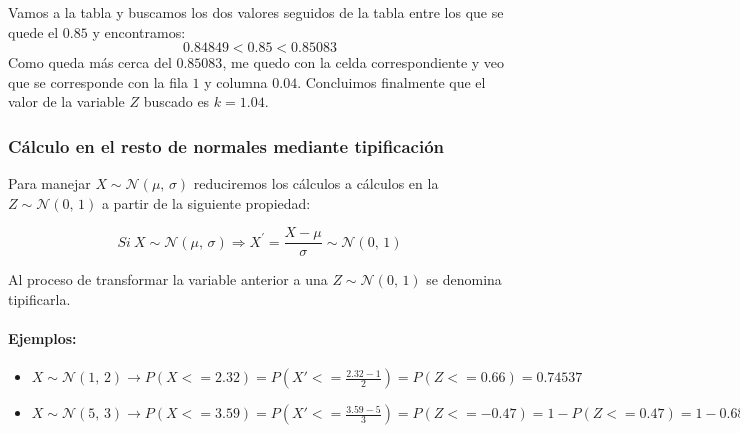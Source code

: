 Vamos a la tabla y buscamos los dos valores seguidos de la tabla entre los que se quede el $0.85$ y encontramos:
$$0.84849 < 0.85 < 0.85083 $$
Como queda más cerca del $0.85083$, me quedo con la celda correspondiente y veo que se corresponde con la fila $1$ y columna $0.04$. Concluimos finalmente que el valor de la variable $Z$ buscado es $k=1.04$.


\subsubsection{Cálculo en el resto de normales mediante tipificación}

Para manejar $X \sim \mathcal{N}(\mu,\,\sigma)$ reduciremos los cálculos a cálculos en la $Z \sim \mathcal{N}(0,\,1)$ a partir de la siguiente propiedad:

$$ Si \  X \sim \mathcal{N}(\mu,\,\sigma) \Rightarrow X^{'}=\frac{X - \mu}{\sigma} \sim \mathcal{N}(0,\,1) $$

Al proceso de transformar la variable anterior a una $Z\sim \mathcal{N}(0,\,1)$ se denomina tipificarla.

\paragraph{Ejemplos:}
\begin{itemize}
    \item $X \sim \mathcal{N}(1,\,2) \to P(X<=2.32)=P(X'<=\frac{2.32-1}{2})=P(Z<=0.66)=0.74537$
    \item $X \sim \mathcal{N}(5,\,3) \to P(X<=3.59)=P(X'<=\frac{3.59-5}{3})=P(Z<=-0.47)=1-P(Z<=0.47)=1-0.68082=0.31918$
\end{itemize}


%










